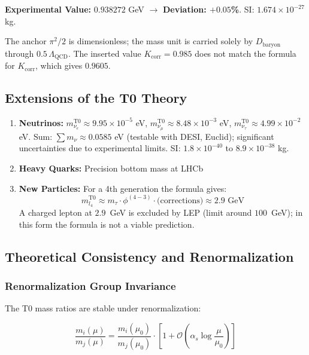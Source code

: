 	\textbf{Experimental Value:} $0.938272$ GeV $\rightarrow$ \textbf{Deviation: $+0.05$\%}. SI: $1.674 \times 10^{-27}$ kg.

	The anchor $\pi^2/2$ is dimensionless; the mass unit is carried solely by $D_{\text{baryon}}$ through $0.5\,\Lambda_{\text{QCD}}$. The inserted value $K_{\text{corr}} = 0.985$ does not match the formula for $K_{\text{corr}}$, which gives $0.9605$.

	\subsection{Extensions of the T0 Theory}
	
	\begin{enumerate}
		\item \textbf{Neutrinos:} $m_{\nu_e}^{\text{T0}} \approx 9.95 \times 10^{-5}$ eV, $m_{\nu_\mu}^{\text{T0}} \approx 8.48 \times 10^{-3}$ eV, $m_{\nu_\tau}^{\text{T0}} \approx 4.99 \times 10^{-2}$ eV. Sum: $\sum m_\nu \approx 0.0585$ eV (testable with DESI, Euclid); significant uncertainties due to experimental limits. SI: $1.8 \times 10^{-40}$ to $8.9 \times 10^{-38}$ kg.

				
		\item \textbf{Heavy Quarks:} Precision bottom mass at LHCb
		
		\item \textbf{New Particles:} For a 4th generation the formula gives:
		\begin{equation}
			m_{l_4}^{\text{T0}} \approx m_\tau \cdot \phi^{(4-3)} \cdot \text{(corrections)} \approx 2.9 \text{ GeV}
		\end{equation}
		A charged lepton at $2.9$~GeV is excluded by LEP (limit around $100$~GeV); in this form the formula is not a viable prediction.
	\end{enumerate}
	
	\subsection{Theoretical Consistency and Renormalization}
	
	\subsubsection{Renormalization Group Invariance}
	
	The T0 mass ratios are stable under renormalization:
	
	\begin{equation}
		\frac{m_i(\mu)}{m_j(\mu)} = \frac{m_i(\mu_0)}{m_j(\mu_0)} \cdot \left[1 + \mathcal{O}\left(\alpha_s \log\frac{\mu}{\mu_0}\right)\right]
	\end{equation}
	
